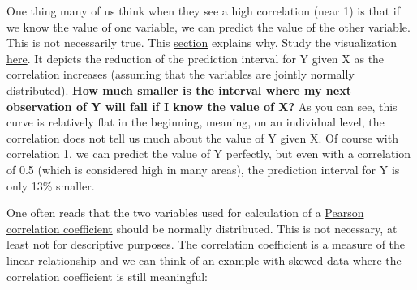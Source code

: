 \documentclass[
]{book}
\begin{document}
One thing many of us think when they see a high correlation (near 1) is that if we know the value of one variable,
we can predict the value of the other variable. This is not necessarily true.
This \href{https://en.wikipedia.org/wiki/Pearson_correlation_coefficient\#Interpretation}{section} explains why.
Study the visualization \href{https://en.wikipedia.org/wiki/Pearson_correlation_coefficient\#/media/File:Pearson_correlation_and_prediction_intervals.svg}{here}.
It depicts the reduction of the prediction interval for Y given X as the correlation
increases (assuming that the variables are jointly normally distributed). \textbf{How much smaller is the interval where my next observation of Y
will fall if I know the value of X?} As you can see, this curve is relatively flat in the beginning, meaning, on an individual level,
the correlation does not tell us much about the value of Y given X.
Of course with correlation 1, we can predict the value of Y perfectly, but even with a correlation of 0.5
(which is considered high in many areas), the prediction interval for Y is only 13\% smaller.

One often reads that the two variables used for calculation of a
\href{https://en.wikipedia.org/wiki/Pearson_correlation_coefficient}{Pearson correlation coefficient} should be normally distributed.
This is not necessary, at least not for descriptive purposes. The correlation coefficient is a measure of the linear relationship
and we can think of an example with skewed data where the correlation coefficient is still meaningful:
\end{document}
